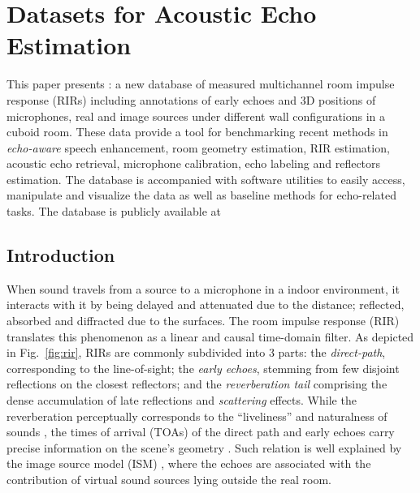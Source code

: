 \chapter{Datasets for Acoustic Echo Estimation}\label{chap:estimation}
\vspace{-2.5em}

This paper presents \dEchorate{}: a new database of measured multichannel room impulse response (RIRs) including annotations of early echoes and 3D positions of microphones, real and image sources under different wall configurations in a cuboid room.
These data provide a tool for benchmarking recent methods in \textit{echo-aware} speech enhancement, room geometry estimation, RIR estimation, acoustic echo retrieval, microphone calibration, echo labeling and reflectors estimation.
The database is accompanied with software utilities to easily access, manipulate and visualize the data as well as baseline methods for echo-related tasks. The database is publicly available at \linkDechorate

\section{Introduction}\label{sec:dechorate:intro}

When sound travels from a source to a microphone in a indoor environment, it interacts with it by being delayed and attenuated due to the distance; reflected, absorbed and diffracted due to the surfaces. The room impulse response (RIR) translates this phenomenon as a linear and causal time-domain filter.
As depicted in Fig.~\ref{fig:rir}, RIRs are commonly subdivided into 3 parts:
the \textit{direct-path}, corresponding to the line-of-sight; the \textit{early echoes}, stemming from few disjoint reflections on the closest reflectors; and the \textit{reverberation tail} comprising the dense accumulation of late reflections and  \textit{scattering} effects. While the reverberation perceptually corresponds to the ``liveliness'' and naturalness of sounds \cite{geldard1953human}, the times of arrival (TOAs) of the direct path and early echoes carry precise information on the scene's geometry \cite{Kuttruff2009room}. Such relation is well explained by the image source model (ISM) \cite{Allen1979image}, where the echoes are associated with the contribution of virtual sound sources lying outside the real room.

